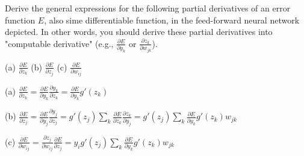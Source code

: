 \documentclass{article}
\begin{document}
Derive the general expressions for the following partial derivatives of an error function $E$, also sime differentiable function, in the feed-forward neural network depicted. In other words, you should derive these partial derivatives into "computable derivative" (e.g., $\frac{\partial E}{\partial y_k}$ or $\frac{\partial z_k}{\partial w_{jk}}$).
\begin{center}
(a) $\frac{\partial E}{\partial z_k}$
(b) $\frac{\partial E}{\partial z_j}$
(c) $\frac{\partial E}{\partial w_{ij}}$
\end{center}

(a) $\frac{\partial E}{\partial z_k} = \frac{\partial E}{\partial y_k}\frac{\partial y_k}{\partial z_k} = \frac{\partial E}{\partial y_k}g'(z_k)$

(b) $\frac{\partial E}{\partial z_j} = \frac{\partial E}{\partial y_j}\frac{\partial y_j}{\partial z_j} = g'(z_j)\sum_{k}\frac{\partial E}{\partial z_k}\frac{\partial z_k}{\partial y_j} = g'(z_j)\sum_{k}\frac{\partial E}{\partial y_k}g'(z_k)w_{jk}$

(c) $\frac{\partial E}{\partial w_{ij}} = \frac{\partial z_j}{\partial w_{ij}}\frac{\partial E}{\partial z_j} = y_i g'(z_j)\sum_{k}\frac{\partial E}{\partial y_k}g'(z_k)w_{jk}$
\end{document}
